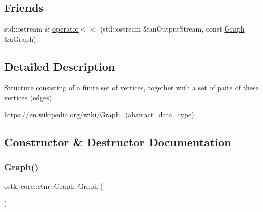 \subsection*{Friends}
\begin{DoxyCompactItemize}
\item 
std\+::ostream \& \hyperlink{classostk_1_1core_1_1ctnr_1_1_graph_a225f9b61ac2385ccf05891298c7ab6b1}{operator$<$$<$} (std\+::ostream \&an\+Output\+Stream, const \hyperlink{classostk_1_1core_1_1ctnr_1_1_graph}{Graph} \&a\+Graph)
\end{DoxyCompactItemize}


\subsection{Detailed Description}
Structure consisting of a finite set of vertices, together with a set of pairs of these vertices (edges). 

https\+://en.wikipedia.\+org/wiki/\+Graph\+\_\+(abstract\+\_\+data\+\_\+type) 

\subsection{Constructor \& Destructor Documentation}
\mbox{\label{classostk_1_1core_1_1ctnr_1_1_graph_aef0aa2732a88c78f82f96e1b0be011a5}} 
\subsubsection{\texorpdfstring{Graph()}{Graph()}\hspace{0.1cm}{\footnotesize\ttfamily [1/2]}}
{\footnotesize\ttfamily ostk\+::core\+::ctnr\+::\+Graph\+::\+Graph (\begin{DoxyParamCaption}{ }\end{DoxyParamCaption})\hspace{0.3cm}{\ttfamily [delete]}}

\mbox{\label{classostk_1_1core_1_1ctnr_1_1_graph_aac2d025d9c98fa83463f1a919c4aba43}} 
